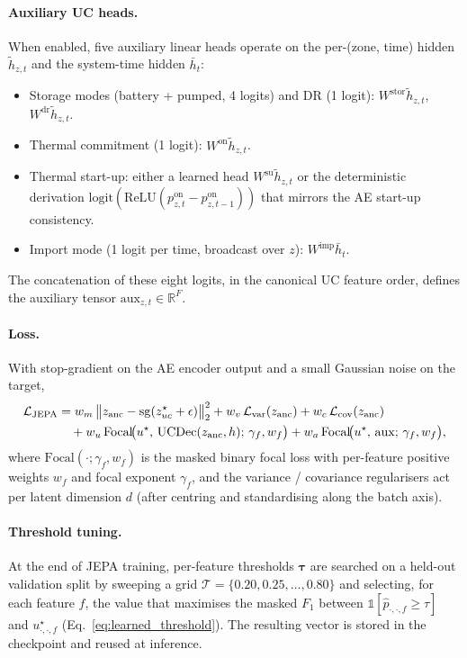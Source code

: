 \documentclass{article}
\begin{document}
\paragraph{Auxiliary UC heads.}
When enabled, five auxiliary linear heads operate on the per-(zone, time) hidden $\tilde h_{z,t}$ and the system-time hidden $\bar h_t$:
\begin{itemize}[noitemsep]
  \item Storage modes (battery + pumped, 4 logits) and DR (1 logit): $W^{\mathrm{stor}}\tilde h_{z,t}$, $W^{\mathrm{dr}}\tilde h_{z,t}$.
  \item Thermal commitment (1 logit): $W^{\mathrm{on}}\tilde h_{z,t}$.
  \item Thermal start-up: either a learned head $W^{\mathrm{su}}\tilde h_{z,t}$ or the deterministic derivation $\mathrm{logit}(\mathrm{ReLU}(p^{\mathrm{on}}_{z,t} - p^{\mathrm{on}}_{z,t-1}))$ that mirrors the AE start-up consistency.
  \item Import mode (1 logit per time, broadcast over $z$): $W^{\mathrm{imp}}\bar h_t$.
\end{itemize}
The concatenation of these eight logits, in the canonical UC feature order, defines the auxiliary tensor $\mathrm{aux}_{z,t} \in \mathbb{R}^F$.

\paragraph{Loss.}
With stop-gradient on the AE encoder output and a small Gaussian noise on the target,
\begin{align}
\mathcal{L}_{\mathrm{JEPA}}
   &= w_m\,\big\|z_{\mathrm{anc}} - \mathrm{sg}(z^\star_{uc} + \epsilon)\big\|_2^2
   + w_v\,\mathcal{L}_{\mathrm{var}}(z_{\mathrm{anc}})
   + w_c\,\mathcal{L}_{\mathrm{cov}}(z_{\mathrm{anc}}) \notag \\
   &\quad + w_u\,\mathrm{Focal}\!\bigl(u^\star,\,\mathrm{UCDec}(z_{\mathrm{anc}}, h);\,\gamma_f, w_f\bigr)
   + w_a\,\mathrm{Focal}\!\bigl(u^\star,\,\mathrm{aux};\,\gamma_f, w_f\bigr),
\end{align}
where $\mathrm{Focal}(\cdot;\gamma_f, w_f)$ is the masked binary focal loss with per-feature positive weights $w_f$ and focal exponent $\gamma_f$, and the variance / covariance regularisers act per latent dimension $d$ (after centring and standardising along the batch axis).

\paragraph{Threshold tuning.}
At the end of JEPA training, per-feature thresholds $\boldsymbol\tau$ are searched on a held-out validation split by sweeping a grid $\mathcal{T} = \{0.20, 0.25, \dots, 0.80\}$ and selecting, for each feature $f$, the value that maximises the masked $F_1$ between $\mathbb{1}[\hat p_{\cdot,\cdot,f} \geq \tau]$ and $u^\star_{\cdot,\cdot,f}$ (Eq.~\ref{eq:learned_threshold}). The resulting vector is stored in the checkpoint and reused at inference.
\end{document}
